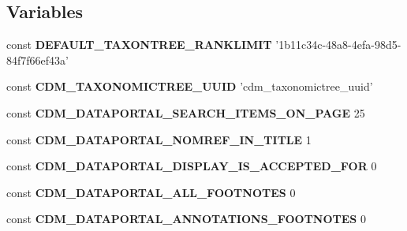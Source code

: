 \subsection*{Variables}
\begin{DoxyCompactItemize}
\item 
\hypertarget{settings_8php_a7269e57d008b6455e0d0d0a8bb42933b}{const {\bfseries D\-E\-F\-A\-U\-L\-T\-\_\-\-T\-A\-X\-O\-N\-T\-R\-E\-E\-\_\-\-R\-A\-N\-K\-L\-I\-M\-I\-T} '1b11c34c-\/48a8-\/4efa-\/98d5-\/84f7f66ef43a'}\label{settings_8php_a7269e57d008b6455e0d0d0a8bb42933b}

\item 
\hypertarget{settings_8php_a58c3b289a0c52da46df791e74db5234d}{const {\bfseries C\-D\-M\-\_\-\-T\-A\-X\-O\-N\-O\-M\-I\-C\-T\-R\-E\-E\-\_\-\-U\-U\-I\-D} 'cdm\-\_\-taxonomictree\-\_\-uuid'}\label{settings_8php_a58c3b289a0c52da46df791e74db5234d}

\item 
\hypertarget{settings_8php_aa9d08b0bab4caa9fe20e62eec4ec4f3c}{const {\bfseries C\-D\-M\-\_\-\-D\-A\-T\-A\-P\-O\-R\-T\-A\-L\-\_\-\-S\-E\-A\-R\-C\-H\-\_\-\-I\-T\-E\-M\-S\-\_\-\-O\-N\-\_\-\-P\-A\-G\-E} 25}\label{settings_8php_aa9d08b0bab4caa9fe20e62eec4ec4f3c}

\item 
\hypertarget{settings_8php_a27c8a6a4e90c5fbc685838cd37e819b2}{const {\bfseries C\-D\-M\-\_\-\-D\-A\-T\-A\-P\-O\-R\-T\-A\-L\-\_\-\-N\-O\-M\-R\-E\-F\-\_\-\-I\-N\-\_\-\-T\-I\-T\-L\-E} 1}\label{settings_8php_a27c8a6a4e90c5fbc685838cd37e819b2}

\item 
\hypertarget{settings_8php_ac92c2a43d987fef24a019de4844905d9}{const {\bfseries C\-D\-M\-\_\-\-D\-A\-T\-A\-P\-O\-R\-T\-A\-L\-\_\-\-D\-I\-S\-P\-L\-A\-Y\-\_\-\-I\-S\-\_\-\-A\-C\-C\-E\-P\-T\-E\-D\-\_\-\-F\-O\-R} 0}\label{settings_8php_ac92c2a43d987fef24a019de4844905d9}

\item 
\hypertarget{settings_8php_a347e9a851cc8a6e9d142ef7c6211ccfc}{const {\bfseries C\-D\-M\-\_\-\-D\-A\-T\-A\-P\-O\-R\-T\-A\-L\-\_\-\-A\-L\-L\-\_\-\-F\-O\-O\-T\-N\-O\-T\-E\-S} 0}\label{settings_8php_a347e9a851cc8a6e9d142ef7c6211ccfc}

\item 
\hypertarget{settings_8php_a5a561ea7685889dd5c6bbd692122e68d}{const {\bfseries C\-D\-M\-\_\-\-D\-A\-T\-A\-P\-O\-R\-T\-A\-L\-\_\-\-A\-N\-N\-O\-T\-A\-T\-I\-O\-N\-S\-\_\-\-F\-O\-O\-T\-N\-O\-T\-E\-S} 0}\label{settings_8php_a5a561ea7685889dd5c6bbd692122e68d}


\end{DoxyCompactItemize}
